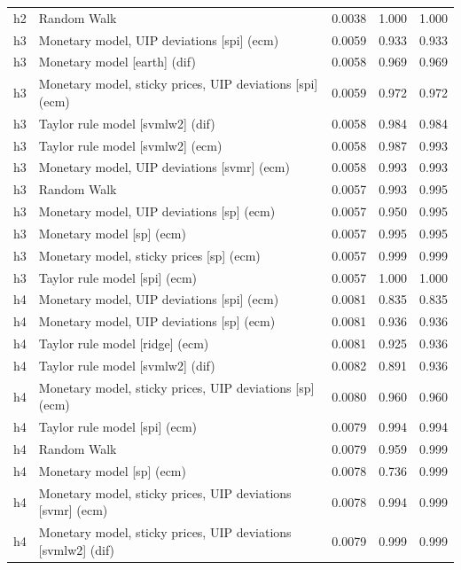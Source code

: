 \begin{ThreePartTable}
\begin{longtable}[t]{cp{5.5cm}ccc}
h2 & \raggedright Random Walk & 0.0038 & 1.000 & 1.000\\
\addlinespace
h3 & \raggedright Monetary model, UIP deviations [spi] (ecm) & 0.0059 & 0.933 & 0.933\\
h3 & \raggedright Monetary model [earth] (dif) & 0.0058 & 0.969 & 0.969\\
h3 & \raggedright Monetary model, sticky prices, UIP deviations [spi] (ecm) & 0.0059 & 0.972 & 0.972\\
h3 & \raggedright Taylor rule model [svmlw2] (dif) & 0.0058 & 0.984 & 0.984\\
h3 & \raggedright Taylor rule model [svmlw2] (ecm) & 0.0058 & 0.987 & 0.993\\
h3 & \raggedright Monetary model, UIP deviations [svmr] (ecm) & 0.0058 & 0.993 & 0.993\\
h3 & \raggedright Random Walk & 0.0057 & 0.993 & 0.995\\
h3 & \raggedright Monetary model, UIP deviations [sp] (ecm) & 0.0057 & 0.950 & 0.995\\
h3 & \raggedright Monetary model [sp] (ecm) & 0.0057 & 0.995 & 0.995\\
h3 & \raggedright Monetary model, sticky prices [sp] (ecm) & 0.0057 & 0.999 & 0.999\\
h3 & \raggedright Taylor rule model [spi] (ecm) & 0.0057 & 1.000 & 1.000\\
\addlinespace
h4 & \raggedright Monetary model, UIP deviations [spi] (ecm) & 0.0081 & 0.835 & 0.835\\
h4 & \raggedright Monetary model, UIP deviations [sp] (ecm) & 0.0081 & 0.936 & 0.936\\
h4 & \raggedright Taylor rule model [ridge] (ecm) & 0.0081 & 0.925 & 0.936\\
h4 & \raggedright Taylor rule model [svmlw2] (dif) & 0.0082 & 0.891 & 0.936\\
h4 & \raggedright Monetary model, sticky prices, UIP deviations [sp] (ecm) & 0.0080 & 0.960 & 0.960\\
h4 & \raggedright Taylor rule model [spi] (ecm) & 0.0079 & 0.994 & 0.994\\
h4 & \raggedright Random Walk & 0.0079 & 0.959 & 0.999\\
h4 & \raggedright Monetary model [sp] (ecm) & 0.0078 & 0.736 & 0.999\\
h4 & \raggedright Monetary model, sticky prices, UIP deviations [svmr] (ecm) & 0.0078 & 0.994 & 0.999\\
h4 & \raggedright Monetary model, sticky prices, UIP deviations [svmlw2] (dif) & 0.0079 & 0.999 & 0.999\\

\end{longtable}
\end{ThreePartTable}
